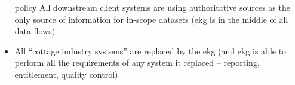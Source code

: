 \kgmmscoringlevelFour

\begin{itemize}[leftmargin=1.5in,font=\bfseries]
    \item [policy] All downstream client systems are using authoritative sources as the only source of information
          for in-scope datasets (\gls{ekg} is in the middle of all data flows)
    \item All “cottage industry systems” are replaced by the \gls{ekg}
          (and \gls{ekg} is able to perform all the requirements of any system it replaced --
         reporting, entitlement, quality control)

\end{itemize}